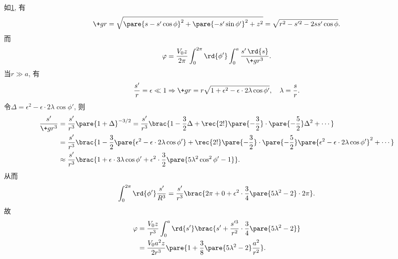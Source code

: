 \documentclass[hidelinks]{ctexart}
\begin{document}
\begin{figure}[ht]
    \centering
    \caption{}
    \label{fig:上半圆Green}
\end{figure}
\begin{sample}
    \begin{ex}
        如\cref{fig:上半圆Green}, 有
        \[ \+gr = \sqrt{\pare{s-s'\cos\phi}^2 + \pare{-s'\sin\phi'}^2 + z^2} = \sqrt{r^2 - s'^2 - 2ss'\cos\phi}. \]
        而
        \[ \varphi = \frac{V_0 z}{2\pi}\int_0^{2\pi}\rd{\phi'}\int_0^a \frac{s'\,\rd{s}}{\+gr^3}. \]
        当$r\gg a$, 有
        \[ \frac{s'}{r} = \epsilon \ll 1 \Rightarrow \+gr = r\sqrt{1+\epsilon^2 - \epsilon\cdot 2\lambda \cos\phi'},\quad \lambda = \frac{s}{r}. \]
        令$\Delta = \epsilon^2 - \epsilon\cdot 2\lambda \cos\phi'$, 则
        \begin{align*}
            \frac{s'}{\+gr^3} &= \frac{s'}{r^3}\pare{1+\Delta}^{-3/2} = \frac{s'}{r^3}\brac{1-\frac{3}{2}\Delta + \rec{2!}\pare{-\frac{3}{2}}\cdot \pare{-\frac{5}{2}}\Delta^2 + \cdots} \\
            &= \frac{s'}{r^3}\brac{1-\frac{3}{2}\pare{\epsilon^2 - \epsilon\cdot 2\lambda \cos\phi'} + \rec{2!}\pare{-\frac{3}{2}}\cdot \pare{-\frac{5}{2}}\pare{\epsilon^2 - \epsilon\cdot 2\lambda \cos\phi'}^2 + \cdots} \\
            &\approx \frac{s'}{r^3}\brac{1+\epsilon\cdot 3\lambda \cos\phi' + \epsilon^2 \cdot \frac{3}{2}\pare{5\lambda^2 \cos^2\phi' - 1}}.
        \end{align*}
        从而
        \[ \int_0^{2\pi}\rd{\phi'}\frac{s'}{R^3} = \frac{s'}{r^3}\brac{2\pi + 0 + \epsilon^2\cdot \frac{3}{4}\pare{5\lambda^2 - 2}\cdot 2\pi}. \]
        故
        \begin{align*}
            \varphi &= \frac{V_0 z}{r^3} \int_0^a \rd{s'}\brac{s' + \frac{s'^3}{r^2}\cdot \frac{3}{4}\pare{5\lambda^2 - 2}} \\
            &= \frac{V_0 a^2 z}{2r^3}\pare{1+\frac{3}{8}\pare{5\lambda^2 - 2}\frac{a^2}{r^2}}.
        \end{align*}
    \end{ex}
\end{sample}
\begin{figure}[ht]
    \centering
    \caption{}
    \label{fig:球Green}
\end{figure}
\end{document}
